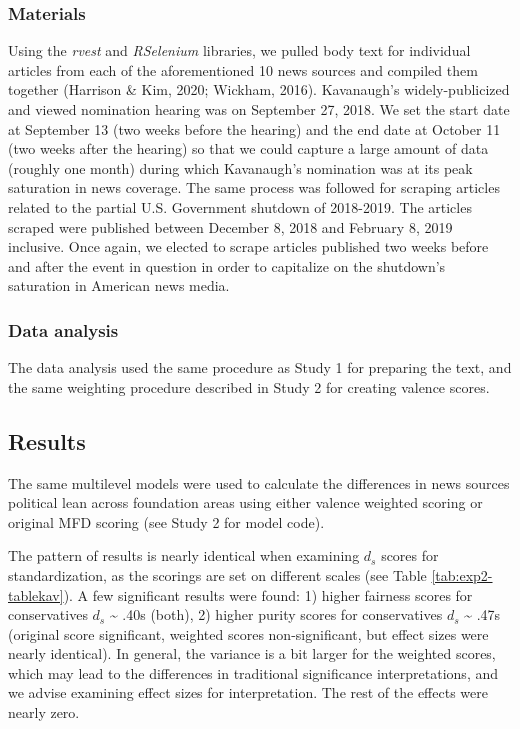 \documentclass[
  man,floatsintext]{apa6}
\begin{document}
\subsubsection{Materials}\label{materials-1}

Using the \emph{rvest} and \emph{RSelenium} libraries, we pulled body text for
individual articles from each of the aforementioned 10 news sources and
compiled them together (Harrison \& Kim, 2020; Wickham, 2016). Kavanaugh's widely-publicized and viewed nomination hearing was on September 27, 2018. We set the start date at September 13 (two weeks before the hearing) and the end date at October 11 (two weeks after the hearing) so that we
could capture a large amount of data (roughly one month) during which
Kavanaugh's nomination was at its peak saturation in news coverage. The same process was followed for scraping articles related to the
partial U.S. Government shutdown of 2018-2019. The articles scraped were
published between December 8, 2018 and February 8, 2019 inclusive. Once
again, we elected to scrape articles published two weeks before and
after the event in question in order to capitalize on the shutdown's
saturation in American news media.

\subsubsection{Data analysis}\label{data-analysis-1}

The data analysis used the same procedure as Study 1 for preparing the text, and the same weighting procedure described in Study 2 for creating valence scores.

\subsection{Results}\label{results-4}

The same multilevel models were used to calculate the differences in news sources political lean across foundation areas using either valence weighted scoring or original MFD scoring (see Study 2 for model code).

The pattern of results is nearly identical when examining \(d_s\) scores for standardization, as the scorings are set on different scales (see Table \ref{tab:exp2-tablekav}). A few significant results were found: 1) higher fairness scores for conservatives \(d_s\) \textasciitilde{} .40s (both), 2) higher purity scores for conservatives \(d_s\) \textasciitilde{} .47s (original score significant, weighted scores non-significant, but effect sizes were nearly identical). In general, the variance is a bit larger for the weighted scores, which may lead to the differences in traditional significance interpretations, and we advise examining effect sizes for interpretation. The rest of the effects were nearly zero.
\end{document}
